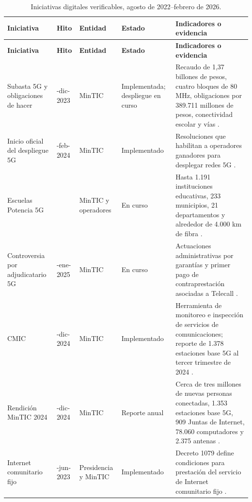 \documentclass[9pt,a4paper,twoside]{rho-class/rho}
\begin{document}
\begin{longtable}{>{\raggedright\arraybackslash}p{}>{\raggedright\arraybackslash}p{}>{\raggedright\arraybackslash}p{}>{\raggedright\arraybackslash}p{}>{\raggedright\arraybackslash}p{}}
\caption{Iniciativas digitales verificables, agosto de 2022--febrero de 2026.}\\
\toprule
\textbf{Iniciativa} & \textbf{Hito} & \textbf{Entidad} & \textbf{Estado} & \textbf{Indicadores o evidencia} \\
\midrule
\endfirsthead
\toprule
\textbf{Iniciativa} & \textbf{Hito} & \textbf{Entidad} & \textbf{Estado} & \textbf{Indicadores o evidencia} \\
\midrule
\endhead
Subasta 5G y obligaciones de hacer & 20-dic-2023 & MinTIC & Implementada; despliegue en curso & Recaudo de 1,37 billones de pesos, cuatro bloques de 80 MHz, obligaciones por 389.711 millones de pesos, conectividad escolar y vías \cite{mintic_5g_realidad_2023}. \\
Inicio oficial del despliegue 5G & 23-feb-2024 & MinTIC & Implementado & Resoluciones que habilitan a operadores ganadores para desplegar redes 5G \cite{mintic_despliegue_5g_2024}. \\
Escuelas Potencia 5G & 2024 & MinTIC y operadores & En curso & Hasta 1.191 instituciones educativas, 233 municipios, 21 departamentos y alrededor de 4.000 km de fibra \cite{mintic_escuelas_potencia_5g_2024}. \\
Controversia por adjudicatario 5G & 29-ene-2025 & MinTIC & En curso & Actuaciones administrativas por garantías y primer pago de contraprestación asociadas a Telecall \cite{mintic_telecall_espectro_5g_2025,lorduy_telecall_conciliacion_2026}. \\
CMIC & 20-dic-2024 & MinTIC & Implementado & Herramienta de monitoreo e inspección de servicios de comunicaciones; reporte de 1.378 estaciones base 5G al tercer trimestre de 2024 \cite{mintic_cmic_telecomunicaciones_2024}. \\
Rendición MinTIC 2024 & 09-dic-2024 & MinTIC & Reporte anual & Cerca de tres millones de nuevas personas conectadas, 1.353 estaciones base 5G, 909 Juntas de Internet, 78.060 computadores y 2.375 antenas \cite{mintic_rendicion_cuentas_2024}. \\
Internet comunitario fijo & 30-jun-2023 & Presidencia y MinTIC & Implementado & Decreto 1079 define condiciones para prestación del servicio de Internet comunitario fijo \cite{funcionpublica_decreto_1079_2023}. \\

\end{longtable}
\end{document}
